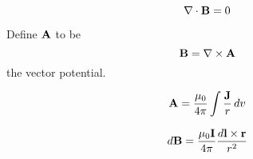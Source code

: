 \documentclass[a4paper]{article}
\begin{document}
\begin{thm} $$\nabla\cdot\vb{B}=0$$
\end{thm}

\begin{defn} Define $\vb{A}$ to be $$\vb{B}=\nabla\times\vb{A}$$ the vector potential. 
\end{defn}

\begin{thm} $$\vb{A}=\frac{\mu_0}{4\pi}\int\frac{\vb{J}}{r}\,dv$$
\end{thm}

\begin{thm} $$d\vb{B}=\frac{\mu_0\vb{I}}{4\pi}\frac{d\vb{l}\times\vb{r}}{r^2}$$
\end{thm}
\end{document}
